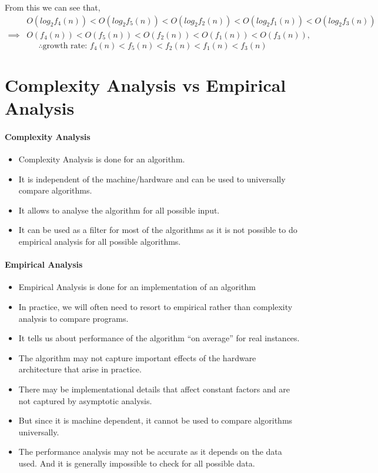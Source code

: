 \documentclass{article}
\begin{document}
From this we can see that,
\begin{align*}
  &O(log_2f_4(n))<O(log_2f_5(n))<O(log_2f_2(n))<O(log_2f_1(n))<O(log_2f_3(n))\\
  \implies &O(f_4(n))<O(f_5(n))<O(f_2(n))<O(f_1(n))<O(f_3(n)), 
\end{align*}
\[\boxed{\therefore \text{growth rate: }f_4(n)<f_5(n)<f_2(n)<f_1(n)<f_3(n)}\]


\pagebreak
\section{Complexity Analysis vs Empirical Analysis}
\label{sec:6}

\paragraph{Complexity Analysis}
\begin{itemize}
\item Complexity Analysis is done for an algorithm.
\item It is independent of the machine/hardware and can be used to universally compare algorithms.
\item It allows to analyse the algorithm for all possible input.
\item It can be used as a filter for most of the algorithms as it is not possible to do empirical analysis for all possible algorithms.
\end{itemize}

\paragraph{Empirical Analysis}
\begin{itemize}
\item Empirical Analysis is done for an implementation of an algorithm
\item In practice, we will often need to resort to empirical
rather than complexity analysis to compare programs.
\item It tells us about performance of the
algorithm “on average” for real instances.
\item The algorithm may not capture important effects of the hardware architecture that arise in practice.
\item There may be implementational details that affect constant factors and are not captured by asymptotic analysis.
\item But since it is machine dependent, it cannot be used to compare algorithms universally.
\item The performance analysis may not be accurate as it depends on the data used. And it is generally impossible to check for all possible data.
\end{itemize}
\end{document}
